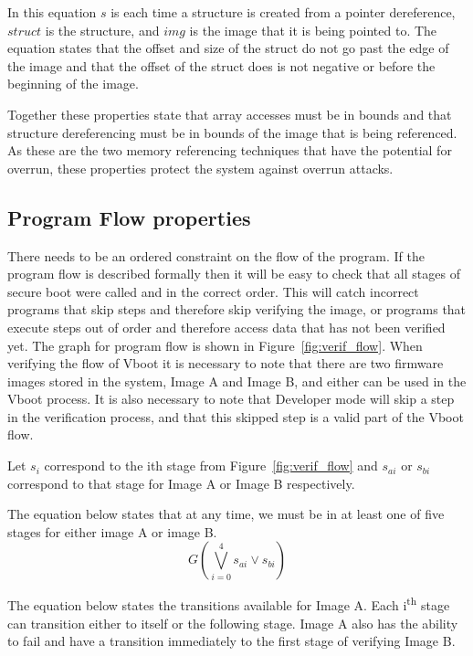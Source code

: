 In this equation $s$ is each time a structure is created from a pointer dereference, $struct$ is the structure, and $img$ is the image that it is being pointed to.
The equation states that the offset and size of the struct do not go past the edge of the image and that the offset of the struct does is not negative or before the beginning of the image.

Together these properties state that array accesses must be in bounds and that structure dereferencing must be in bounds of the image that is being referenced.
As these are the two memory referencing techniques that have the potential for overrun, these properties protect the system against overrun attacks.

\subsection{Program Flow properties}

There needs to be an ordered constraint on the flow of the program. 
If the program flow is described formally then it will be easy to check that all stages of secure boot were called and in the correct order.
This will catch incorrect programs that skip steps and therefore skip verifying the image, or programs that execute steps out of order and therefore access data that has not been verified yet.
The graph for program flow is shown in Figure~\ref{fig:verif_flow}.
When verifying the flow of Vboot it is necessary to note that there are two firmware images stored in the system, Image A and Image B, and either can be used in the Vboot process. 
It is also necessary to note that Developer mode will skip a step in the verification process, and that this skipped step is a valid part of the Vboot flow.

Let $s_i$ correspond to the ith stage from Figure~\ref{fig:verif_flow} and $s_{ai}$ or $s_{bi}$ correspond to that stage for Image A or Image B respectively.

The equation below states that at any time, we must be in at least one of five stages for either image A or image B.
\begin{equation}
    G(\bigvee\limits_{i = 0}^{4} s_{ai} \lor s_{bi})
\end{equation}

The equation below states the transitions available for Image A.
Each i\textsuperscript{th} stage can transition either to itself or the following stage.
Image A also has the ability to fail and have a transition immediately to the first stage of verifying Image B.

